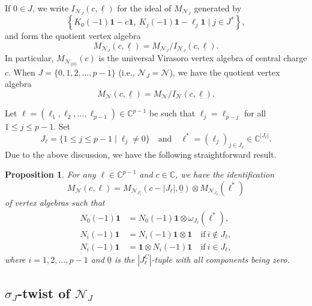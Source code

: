 \documentclass[12pt, reqno]{amsart}
\numberwithin{equation}{section}
\newtheorem{proposition}[theorem]{Proposition}%
\numberwithin{equation}{section}
\newcommand{\C}{\mathbb C}
\newcommand{\CN}{\mathcal{N}}
\newcommand{\un}[1]{\underline{#1}}
\begin{document}
If $0\in J$, we write $I_{\mathcal{N}_J}(c,\underline{\ell})$ for
the ideal of $M_{\mathcal{N}_J}$ generated by
\[
\left\{K_0(-1){\bm 1}-c{\bm 1},\ K_j(-1){\bm 1}-\ell_j{\bm 1}\mid j\in J^*\right\},\] and
form the quotient vertex algebra
\[
M_{\mathcal{N}_J}(c,\underline{\ell})=M_{\mathcal{N}_J}/ I_{\mathcal{N}_J}(c,\underline{\ell}).
\]
In particular, $M_{\mathcal{N}_{\{0\}}}(c)$ is the universal Virasoro vertex algebra of central charge $c$.
When $J=\{0,1,2,\dots,p-1\}$ (i.e., $\CN_J=\CN$), we have the quotient vertex algebra
\[
M_{\mathcal{N}}(c,\underline{\ell})=M_{\mathcal{N}}/ I_{\mathcal{N}}(c,\underline{\ell}).
\]



Let $\bm{\ell}=(\ell_1,\ell_2,\dots,\ell_{p-1})\in \C^{p-1}$ be such that $\ell_j=\ell_{p-j}$ for all $1\le j\le p-1$. Set
\[
J_{\bm \ell}=\{1\le j\le p-1\mid \ell_j\ne 0\}\quad \text{and}\quad
{\bm \ell}^*=(\ell_j)_{j\in J_{\bm \ell}}\in \C^{|J_{\bm \ell}|}.
\]
Due to the above discussion, we have the following straightforward result.

\begin{proposition}\label{vaiden}
For any $\bm{\ell}\in \C^{p-1}$ and $ c\in \C$,
we have the identification
\begin{equation} \label{voaid}
 M_{\mathcal{N}}(c,\bm{\ell})=M_{\mathcal{N}_{J_{\bm\ell}^c}}(c-|J_{\bm{\ell}}|,{\un 0})\otimes M_{\mathcal{N}_{J_{\bm{\ell}}}}(\bm{\ell}^*)
\end{equation}
of vertex algebras such that
\begin{equation}\begin{split}\label{conformaliden}
   N_0(-1){\bm 1}&= N_0(-1){\bm 1}\otimes \omega_{J_{\bm\ell}}({\bm\ell}^*),\\
   N_i(-1){\bm 1}&=N_{i}(-1){\bm 1}\otimes {\bm 1}\quad \text{if}\ i\notin J_{\bm\ell},\\
   N_i(-1){\bm 1}&= {\bm 1}\otimes N_{i}(-1){\bm 1}\quad \text{if}\ i\in J_{\bm\ell},
\end{split}
\end{equation}
where $i=1,2,\dots,p-1$ and $\un{0}$ is the $|J_{\bm\ell}^C|$-tuple with all components being zero.
\end{proposition}



\subsection{$\sigma_J$-twist of $\mathcal{N}_J$}
\end{document}
